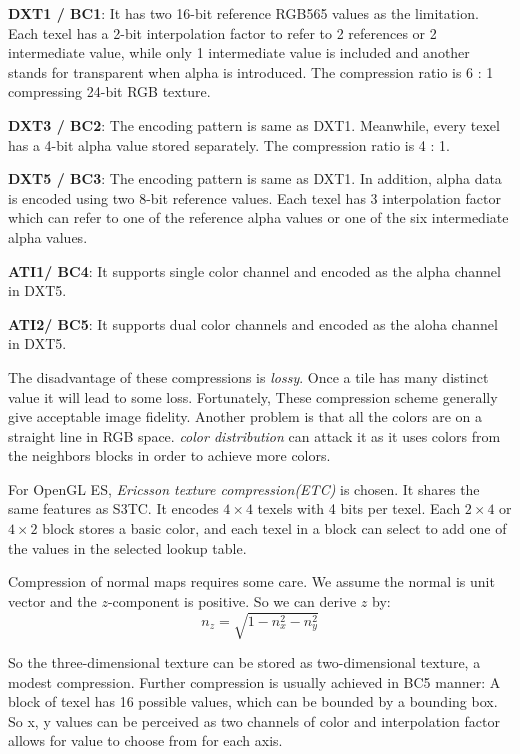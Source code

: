 \documentclass[10pt, a4paper]{article}
\begin{document}
    \quad \textbf{DXT1 / BC1}: It has two 16-bit reference RGB565 values as the limitation. Each texel has a 2-bit interpolation factor to refer to 2 references or 2 intermediate value, while only 1 intermediate value is included and another stands for transparent when alpha is introduced. The compression ratio is 6 : 1 compressing 24-bit RGB texture. 

    \quad \textbf{DXT3 / BC2}: The encoding pattern is same as DXT1. Meanwhile, every texel has a 4-bit alpha value stored separately. The compression ratio is 4 : 1. 

    \quad \textbf{DXT5 / BC3}: The encoding pattern is same as DXT1. In addition, alpha data is encoded using two 8-bit reference values. Each texel has 3 interpolation factor which can refer to one of the reference alpha values or one of the six intermediate alpha values. 

    \quad \textbf{ATI1/ BC4}:  It supports single color channel and encoded as the alpha channel in DXT5.

    \quad \textbf{ATI2/ BC5}: It supports dual color channels and encoded as the aloha channel in DXT5. 

    The disadvantage of these compressions is \emph{lossy}. Once a tile has many distinct value it will lead to some loss. Fortunately, These compression scheme generally give acceptable image fidelity. Another problem is that all the colors are on a straight line in RGB space. \emph{color distribution} can attack it as it uses colors from the neighbors blocks in order to achieve more colors. 

    For OpenGL ES, \emph{Ericsson texture compression(ETC)} is chosen. It shares the same features as S3TC. It encodes $4 \times 4$ texels with 4 bits per texel. Each $2 \times 4$ or $4 \times 2$ block stores a basic color, and each texel in a block can select to add one of the values in the selected lookup table. 

    Compression of normal maps requires some care. We assume the normal is unit vector and the $z$-component is positive. So we can derive $z$ by: 
    $$n_z = \sqrt{1 - n_x^2 - n_y^2}$$
    
    So the three-dimensional texture can be stored as two-dimensional texture, a modest compression. Further compression is usually achieved in BC5 manner: A block of texel has 16 possible values, which can be bounded by a bounding box. So x, y values can be perceived as two channels of color and interpolation factor allows for value to choose from for each axis. 
\end{document}
